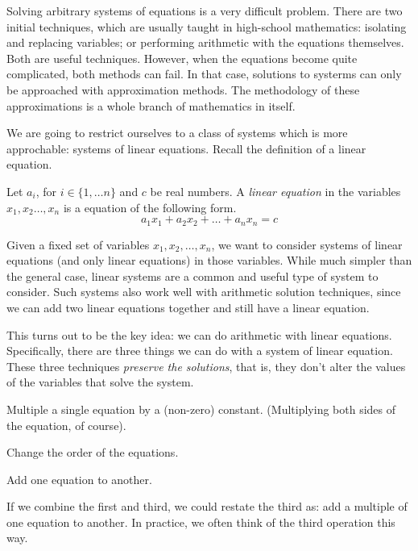 \documentclass[fleqn]{report}
\begin{document}
Solving arbitrary systems of equations is a very difficult
problem. There are two initial techniques, which are usually
taught in high-school mathematics: isolating and replacing
variables; or performing arithmetic with the equations
themselves. Both are useful techniques. However, when the
equations become quite complicated, both methods can fail. In
that case, solutions to systerms can only be approached with
approximation methods. The methodology of these approximations is
a whole branch of mathematics in itself. 

We are going to restrict ourselves to a class of systems which
is more approchable: systems of linear equations. Recall the
definition of a linear equation.

\begin{defn}
Let $a_i$, for $i \in \{1, \ldots n\}$ and $c$ be real
numbers. A \emph{linear equation} in the variables $x_1, x_2
\ldots, x_n$ is a equation of the following form.
\begin{equation*}
a_1 x_1 + a_2 x_2 + \ldots + a_n x_n = c
\end{equation*}
\end{defn}

Given a fixed set of variables $x_1, x_2, \ldots, x_n$, we want
to consider systems of linear equations (and only linear
equations) in those variables. While much simpler than the
general case, linear systems are a common and useful type of system
to consider. Such systems also work well with arithmetic
solution techniques, since we can add two linear equations together
and still have a linear equation. 

This turns out to be the key idea: we can do arithmetic with
linear equations. Specifically, there are three things we can
do with a system of linear equation. These three techniques
\emph{preserve the solutions}, that is, they don't alter 
the values of the variables that solve the system.
\begin{smallitemize}
\item Multiple a single equation by a (non-zero) constant.
(Multiplying both sides of the equation, of course).
\item Change the order of the equations.
\item Add one equation to another.
\end{smallitemize}
If we combine the first and third, we could restate the third
as: add a multiple of one equation to another. In practice, we
often think of the third operation this way.
\end{document}
